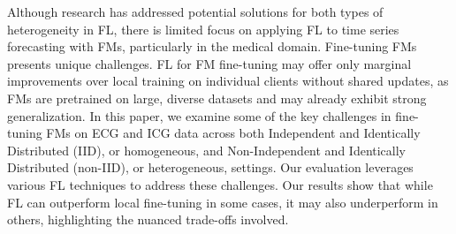 Although research has addressed potential solutions for both types of heterogeneity in FL, there is limited focus on applying FL to time series forecasting with FMs, particularly in the medical domain. 
Fine-tuning FMs presents unique challenges. FL for FM fine-tuning may offer only marginal improvements over local training on individual clients without shared updates, as FMs are pretrained on large, diverse datasets and may already exhibit strong generalization. 
In this paper, we examine some of the key challenges in fine-tuning FMs on ECG and ICG data across both Independent and Identically Distributed (IID), or homogeneous, and Non-Independent and Identically Distributed (non-IID), or heterogeneous, settings. 
Our evaluation leverages various FL techniques to address these challenges.
Our results show that while FL can outperform local fine-tuning in some cases, it may also underperform in others, highlighting the nuanced trade-offs involved.



